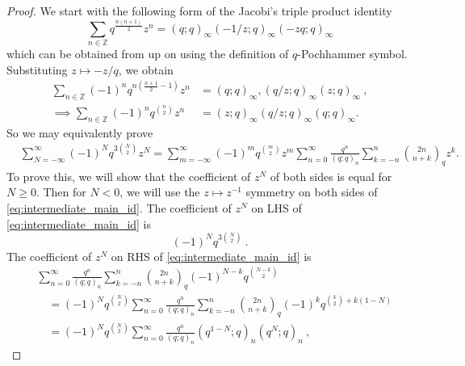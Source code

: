 \documentclass[a4paper,10pt]{article}
\begin{document}
\begin{proof}
We start with the following form of the  Jacobi's triple product identity
%
\begin{equation}
\sum_{n \in \mathds{Z}} q^{\frac{n(n+1)}{2}} z^n=(q ; q)_{\infty}\left(-1/z ; q\right)_{\infty}(-z q ; q)_{\infty}
\end{equation}
which can be obtained from \cite[Theorem 2.8, Page 21]{andrews1998theory} up on using the definition of $q$-Pochhammer symbol. Substituting $z \mapsto-z / q$, we obtain 
\begin{align}
\sum_{n \in \mathds{Z}}(-1)^n q^{n\left(\frac{n+1}{2}-1\right)} z^n&=(q ; q)_{\infty},(q / z ; q)_{\infty}(z ; q)_{\infty}~,
\\\implies
\sum_{n \in \mathds{Z}}(-1)^n q^{\binom{n}{2}} z^n&=(z ; q)_{\infty}(q / z ; q)_{\infty}(q ; q)_{\infty} .
\end{align}
So we may equivalently prove
\begin{equation}\label{eq:intermediate_main_id}
\begin{aligned}
& \sum_{N=-\infty}^{\infty}(-1)^N q^{3\binom{N}{2}} z^N=\sum_{m=-\infty}^{\infty}(-1)^m q^{\binom{m}{2}} z^m \sum_{n=0}^{\infty} \frac{q^n}{(q ; q)_n} \sum_{k=-n}^n{
2 n \choose
n+k}_q z^k .
\end{aligned}
\end{equation}
To prove this, we will show that the coefficient of $z^N$ of both sides is equal for $N \geq 0$. Then for $N < 0$, we will use the $z \mapsto z^{-1}$ symmetry on both sides of \eqref{eq:intermediate_main_id}.
The coefficient of $z^N$ on LHS of \eqref{eq:intermediate_main_id} is
\begin{equation}\label{eq:LHS_zN_coeff}
(-1)^N q^{3{N\choose 2}}~.
\end{equation}
The coefficient of $z^N$ on RHS of \eqref{eq:intermediate_main_id} is
\begin{equation}\label{eq:RHS_zN_coeff}
\begin{aligned}
& \sum_{n=0}^{\infty} \frac{q^n}{(q ; q)_n} \sum_{k=-n}^n{
2 n \choose
n+k}_q(-1)^{N-k} q^{\binom{N-k}{2}} \\
& \quad=(-1)^N q^{\binom{N}{2}} \sum_{n=0}^{\infty} \frac{q^n}{(q ; q)_n} \sum_{k=-n}^n{
2 n \choose
n+k}_q(-1)^k q^{\binom{k}{2}+k(1-N)} \\
& \quad=(-1)^N q^{\binom{N}{2}} \sum_{n=0}^{\infty} \frac{q^n}{(q ; q)_n}\left(q^{1-N} ; q\right)_n\left(q^N ; q\right)_n~,
\end{aligned}
\end{equation}

\end{proof}
\end{document}
